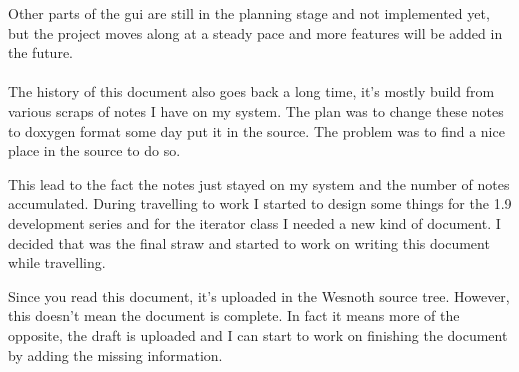 Other parts of the gui are still in the planning stage and not implemented yet,
but the project moves along at a steady pace and more features will be added in
the future.

\paragraph{}

The history of this document also goes back a long time, it's mostly build from
various scraps of notes I have on my system. The plan was to change these notes
to doxygen format some day put it in the source. The problem was to find a nice
place in the source to do so.

This lead to the fact the notes just stayed on my system and the number of
notes accumulated. During travelling to work I started to design some things for
the 1.9 development series and for the iterator class I needed a new kind of
document. I decided that was the final straw and started to work on writing this
document while travelling.

Since you read this document, it's uploaded in the Wesnoth source tree. However, this
doesn't mean the document is complete. In fact it means more of the opposite, the
draft is uploaded and I can start to work on finishing the document by adding
the missing information.

